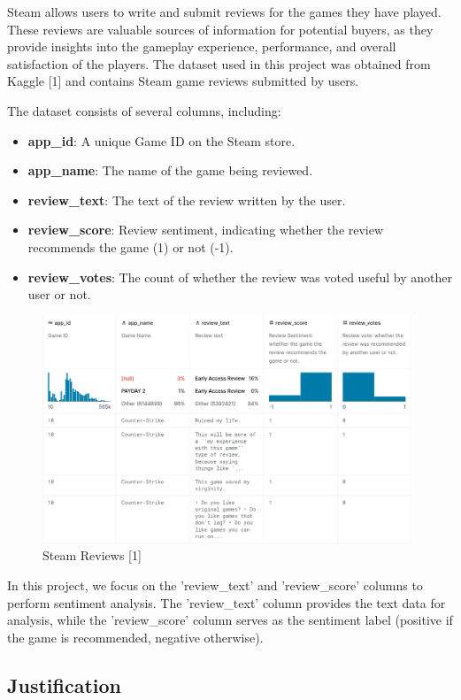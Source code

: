 \documentclass{article}
\begin{document}
Steam allows users to write and submit reviews for the games they have played. These reviews are valuable sources of information for potential buyers, as they provide insights into the gameplay experience, performance, and overall satisfaction of the players. The dataset used in this project was obtained from Kaggle [1] and contains Steam game reviews submitted by users.

The dataset consists of several columns, including:

\begin{itemize}
\item \textbf{app\_id}: A unique Game ID on the Steam store.
\item \textbf{app\_name}: The name of the game being reviewed.
\item \textbf{review\_text}: The text of the review written by the user.
\item \textbf{review\_score}: Review sentiment, indicating whether the review recommends the game (1) or not (-1).
\item \textbf{review\_votes}: The count of whether the review was voted useful by another user or not.
\end{itemize}

\begin{figure}[H]
  \includegraphics[width=12cm]{img/fig_1.png}
  \centering
  \caption{Steam Reviews [1]}
\end{figure}

In this project, we focus on the 'review\_text' and 'review\_score' columns to perform sentiment analysis. The 'review\_text' column provides the text data for analysis, while the 'review\_score' column serves as the sentiment label (positive if the game is recommended, negative otherwise).


\subsection{Justification}
\end{document}
